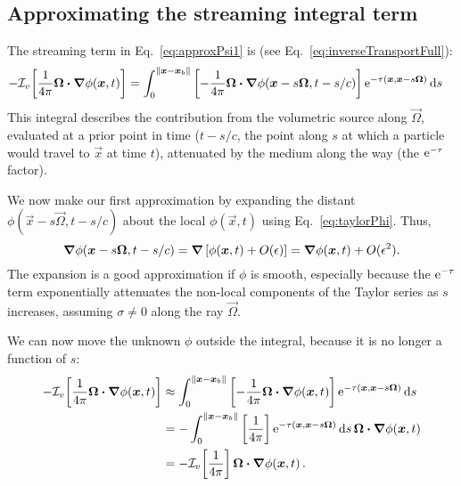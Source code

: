 \subsection{Approximating the streaming integral term}
The streaming term in Eq.~\eqref{eq:approxPsi1} is (see
Eq.~\eqref{eq:inverseTransportFull}):
\begin{align*}
- \mathcal{I}_{v}\!\left[\frac{1}{4\pi} \bm{\Omega}\bm{\cdot} \bm{\nabla} \phi(\bm{x}, t)\right]
  &= \int_{0}^{\left\| \bm{x} - \bm{x}_b \right\|}
    \left[ -\frac1{4\pi}\bm{\Omega}\bm{\cdot} \bm{\nabla} \phi(\bm{x} - s \bm{\Omega},
    t-s/c)
    \right]
    \mathop{}\!\mathrm{e}^{ -\tau(\bm{x}, \bm{x} - s \bm{\Omega})}
    \mathop{}\!\mathrm{d} s
\end{align*}
This integral describes the contribution from the volumetric source  along
$\vec{\Omega}$, evaluated at a prior
point in time ($t-s/c$, the point along $s$ at which a particle would travel
to $\vec{x}$ at time $t$), attenuated by the medium along the way (the
$\mathop{}\!\mathrm{e}^{ -\tau }$ factor).

We now make our first approximation by expanding the distant $\phi(\vec{x} - s
\vec{\Omega}, t-s/c)$ about the local $\phi(\vec{x}, t)$ using
Eq.~\eqref{eq:taylorPhi}. Thus,
\begin{equation*}
  \bm{\nabla} \phi(\bm{x} - s \bm{\Omega}, t-s/c)
  = \bm{\nabla} \left[ \phi(\bm{x}, t) + O(\epsilon) \right]
  = \bm{\nabla} \phi(\bm{x}, t) + O(\epsilon^2).
\end{equation*}
The expansion is a good approximation if $\phi$ is smooth, especially because the
$\mathop{}\!\mathrm{e}^{ -\tau }$ term exponentially attenuates the non-local components of the
Taylor series as $s$ increases, assuming $\sigma\ne 0$ along the ray
$\vec{\Omega}$.

We can now move the unknown $\phi$ outside the integral,
because it is no longer a function of $s$:
\begin{align}\nonumber
- \mathcal{I}_{v}\!\left[\frac{1}{4\pi} \bm{\Omega}\bm{\cdot} \bm{\nabla} \phi(\bm{x}, t)\right]
  &\approx \int_{0}^{\left\| \bm{x} - \bm{x}_b \right\|}
    \left[ -\frac1{4\pi}\bm{\Omega}\bm{\cdot} \bm{\nabla} \phi(\bm{x},t) \right]
    \mathop{}\!\mathrm{e}^{ -\tau(\bm{x}, \bm{x} - s \bm{\Omega})}
    \mathop{}\!\mathrm{d} s
  \\\nonumber
  &= - \int_{0}^{\left\| \bm{x} - \bm{x}_b \right\|}
    \left[ \frac1{4\pi}\right]
    \mathop{}\!\mathrm{e}^{ -\tau(\bm{x}, \bm{x} - s \bm{\Omega})} \mathop{}\!\mathrm{d} s \,
    \bm{\Omega}\bm{\cdot} \bm{\nabla} \phi(\bm{x},t)
  \\\label{eq:streamingApprox}
  &= - \mathcal{I}_{v}\!\left[ \frac1{4\pi} \right] \bm{\Omega}\bm{\cdot} \bm{\nabla} \phi(\bm{x},t)
  \,.
\end{align}

